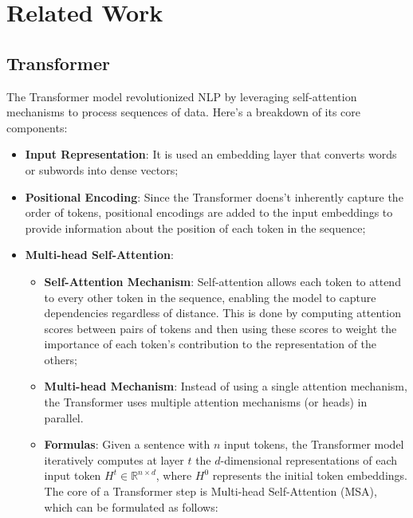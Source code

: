 \section{Related Work}

\subsection{Transformer}

The Transformer model revolutionized NLP by leveraging self-attention mechanisms
to process sequences of data. Here's a breakdown of its core components:

\begin{itemize}
    \item \textbf{Input Representation}: It is used an embedding layer that
        converts words or subwords into dense vectors;

    \item \textbf{Positional Encoding}: Since the Transformer doens't inherently
        capture the order of tokens, positional encodings are added to the input
        embeddings to provide information about the position of each token in 
        the sequence;

    \item \textbf{Multi-head Self-Attention}: 

        \begin{itemize}

        \item \textbf{Self-Attention Mechanism}:
        Self-attention allows each token
        to attend to every other token in the sequence, enabling the model to
        capture dependencies regardless of distance. This is done by computing
        attention scores between pairs of tokens and then using these scores to
        weight the importance of each token’s contribution to the representation
        of the others;

        \item \textbf{Multi-head Mechanism}:
        Instead of using a single attention mechanism, the Transformer uses
        multiple attention mechanisms (or heads) in parallel.

        \item \textbf{Formulas}:
        Given a sentence with $n$ input tokens, the Transformer model
        iteratively computes at layer $t$ the $d$-dimensional representations of
        each input token $H^t \in \mathbb{R}^{n \times d}$, where $H^0$
        represents the initial token embeddings. The core of a Transformer step
        is Multi-head Self-Attention (MSA), which can be formulated as follows:


\end{itemize}
\end{itemize}
